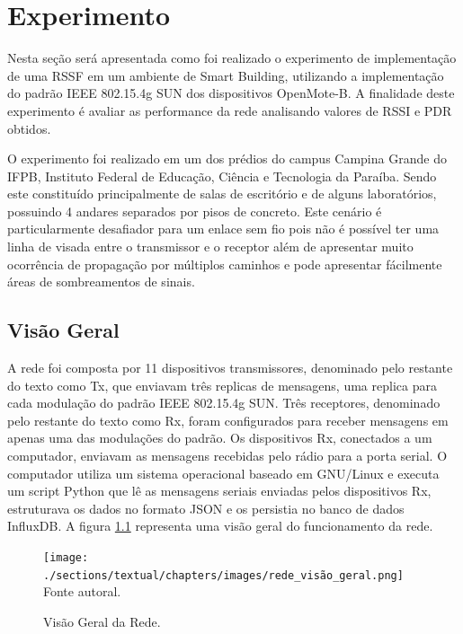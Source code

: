 \chapter{Experimento}
\label{experimento}

Nesta seção será apresentada como foi realizado o experimento de implementação de uma RSSF em um ambiente de Smart Building, utilizando a implementação do padrão IEEE 802.15.4g SUN dos dispositivos OpenMote-B. A finalidade deste experimento é avaliar as performance da rede analisando valores de RSSI e PDR obtidos.

O experimento foi realizado em um dos prédios do campus Campina Grande do IFPB, Instituto Federal de Educação, Ciência e Tecnologia da Paraíba. Sendo este constituído principalmente de salas de escritório e de alguns laboratórios, possuindo 4 andares separados por pisos de concreto. Este cenário é particularmente desafiador para um enlace sem fio pois não é possível ter uma linha de visada entre o transmissor e o receptor além de apresentar muito ocorrência de propagação por múltiplos caminhos e pode apresentar fácilmente áreas de sombreamentos de sinais.

\section{Visão Geral}
\label{subsec:visaogeral}
A rede foi composta por 11 dispositivos transmissores, denominado pelo restante do texto como Tx, que enviavam três replicas de mensagens, uma replica para cada modulação do padrão IEEE 802.15.4g SUN. Três receptores, denominado pelo restante do texto como Rx, foram configurados para receber mensagens em apenas uma das modulações do padrão. Os dispositivos Rx, conectados a um computador, enviavam as mensagens recebidas pelo rádio para a porta serial. O computador utiliza um sistema operacional baseado em GNU/Linux e executa um script Python que lê as mensagens seriais enviadas pelos dispositivos Rx, estruturava os dados no formato JSON e os persistia no banco de dados InfluxDB. A figura \ref{fig:rede_visão_geral} representa uma visão geral do funcionamento da rede.

\begin{figure}[h]
    \begin{center}
        \caption{Visão Geral da Rede.}
        \texttt{[image: ./sections/textual/chapters/images/rede\_visão\_geral.png]}\\
        Fonte autoral.
        \label{fig:rede_visão_geral}
    \end{center}
\end{figure}

